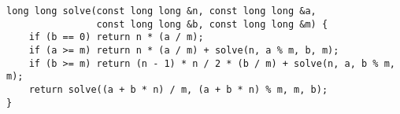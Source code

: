 \begin{lstlisting}
long long solve(const long long &n, const long long &a,
                const long long &b, const long long &m) {
    if (b == 0) return n * (a / m);
    if (a >= m) return n * (a / m) + solve(n, a % m, b, m);
    if (b >= m) return (n - 1) * n / 2 * (b / m) + solve(n, a, b % m, m);
    return solve((a + b * n) / m, (a + b * n) % m, m, b);
}
\end{lstlisting}
